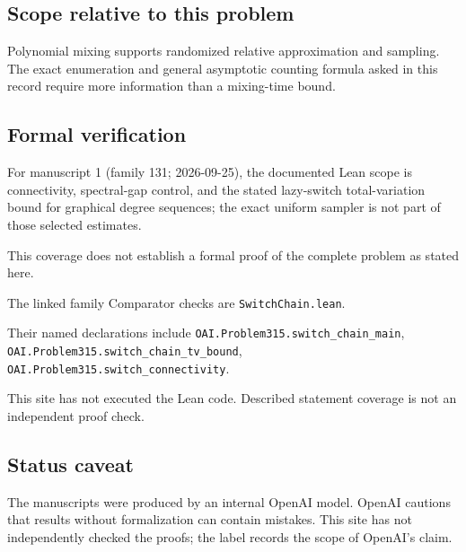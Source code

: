 \documentclass[11pt]{article}
\begin{document}
\subsection{Scope relative to this problem}
Polynomial mixing supports randomized relative approximation and sampling. The exact enumeration and general asymptotic counting formula asked in this record require more information than a mixing-time bound.

\subsection{Formal verification}
For manuscript 1 (family 131; 2026-09-25), the documented Lean scope is connectivity, spectral-gap control, and the stated lazy-switch total-variation bound for graphical degree sequences; the exact uniform sampler is not part of those selected estimates.

This coverage does not establish a formal proof of the complete problem as stated here.

The linked family Comparator checks are \texttt{SwitchChain.lean}.

Their named declarations include \texttt{OAI.Problem315.switch\_chain\_main}, \texttt{OAI.Problem315.switch\_chain\_tv\_bound}, \texttt{OAI.Problem315.switch\_connectivity}.

This site has not executed the Lean code. Described statement coverage is not an independent proof check.

\subsection{Status caveat}
The manuscripts were produced by an internal OpenAI model. OpenAI cautions that results without formalization can contain mistakes. This site has not independently checked the proofs; the label records the scope of OpenAI's claim.
\end{document}
